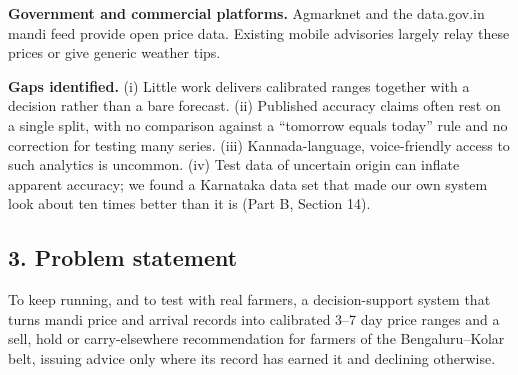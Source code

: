 \documentclass[11pt,a4paper]{article}
\begin{document}
\textbf{Government and commercial platforms.} Agmarknet and the data.gov.in mandi feed provide open price data. Existing mobile advisories largely relay these prices or give generic weather tips.

\textbf{Gaps identified.} (i) Little work delivers calibrated ranges together with a decision rather than a bare forecast. (ii) Published accuracy claims often rest on a single split, with no comparison against a ``tomorrow equals today'' rule and no correction for testing many series. (iii) Kannada-language, voice-friendly access to such analytics is uncommon. (iv) Test data of uncertain origin can inflate apparent accuracy; we found a Karnataka data set that made our own system look about ten times better than it is (Part B, Section 14).

\subsection*{3. Problem statement}
To keep running, and to test with real farmers, a decision-support system that turns mandi price and arrival records into calibrated 3--7 day price ranges and a sell, hold or carry-elsewhere recommendation for farmers of the Bengaluru--Kolar belt, issuing advice only where its record has earned it and declining otherwise.
\end{document}
